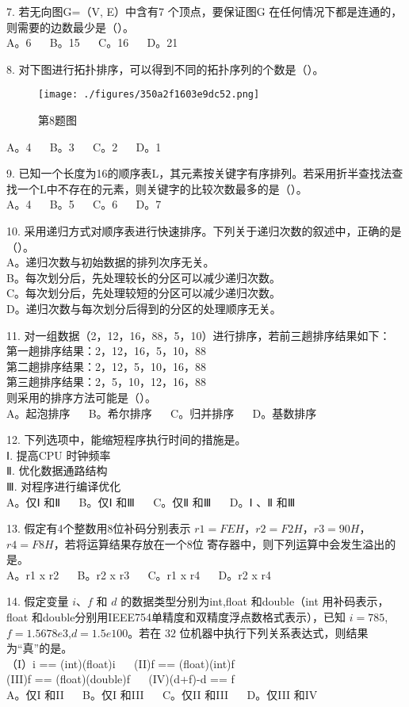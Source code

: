 7. 若无向图G=（V, E）中含有7 个顶点，要保证图G 在任何情况下都是连通的，则需要的边数最少是（）。 \\
A。6 $\quad$ B。15 $\quad$ C。16 $\quad$ D。21

8. 对下图进行拓扑排序，可以得到不同的拓扑序列的个数是（）。 \\
\begin{figure}[ht]
\centering
\texttt{[image: ./figures/350a2f1603e9dc52.png]}
\caption{第8题图} \label{fig_CSN10_3}
\end{figure}
A。4 $\quad$ B。3 $\quad$ C。2 $\quad$ D。1

9. 已知一个长度为16的顺序表L，其元素按关键字有序排列。若采用折半查找法查找一个L中不存在的元素，则关键字的比较次数最多的是（）。 \\
A。4 $\quad$ B。5 $\quad$ C。6 $\quad$ D。7

10. 采用递归方式对顺序表进行快速排序。下列关于递归次数的叙述中，正确的是（）。 \\
A。递归次数与初始数据的排列次序无关。 \\
B。每次划分后，先处理较长的分区可以减少递归次数。 \\
C。每次划分后，先处理较短的分区可以减少递归次数。 \\
D。递归次数与每次划分后得到的分区的处理顺序无关。

11. 对一组数据（2，12，16，88，5，10）进行排序，若前三趟排序结果如下： \\
第一趟排序结果：2，12，16，5，10，88 \\
第二趟排序结果：2，12，5，10，16，88 \\
第三趟排序结果：2，5，10，12，16，88 \\
则采用的排序方法可能是（）。 \\
A。起泡排序 $\quad$ B。希尔排序 $\quad$ C。归并排序 $\quad$ D。基数排序

12. 下列选项中，能缩短程序执行时间的措施是。 \\
Ⅰ. 提高CPU 时钟频率 \\
Ⅱ. 优化数据通路结构 \\
Ⅲ. 对程序进行编译优化 \\
A。仅Ⅰ 和Ⅱ $\quad$ B。仅Ⅰ 和Ⅲ $\quad$ C。仅Ⅱ 和Ⅲ $\quad$ D。Ⅰ 、Ⅱ 和Ⅲ

13. 假定有4个整数用8位补码分别表示 $r1=FEH$，$r2=F2H$，$r3=90H$，$r4=F8H$，若将运算结果存放在一个8位
寄存器中，则下列运算中会发生溢出的是。 \\
A。r1 x r2 $\quad$ B。r2 x r3 $\quad$ C。r1 x r4 $\quad$ D。r2 x r4

14. 假定变量 $i$、$f$ 和 $d$ 的数据类型分别为int,float 和double（int 用补码表示，float 和double分别用IEEE754单精度和双精度浮点数格式表示），已知 $i=785$,$f=1.5678e3$,$d=1.5e100$。若在 $32$ 位机器中执行下列关系表达式，则结果为“真”的是。 \\
（I）i == (int)(float)i $\quad$ (II)f == (float)(int)f \\
(III)f == (float)(double)f $\quad$ (IV)(d+f)-d == f \\
A。仅I 和II $\quad$ B。仅I 和III $\quad$ C。仅II 和III $\quad$ D。仅III 和IV


